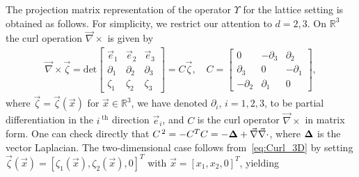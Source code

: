 \documentclass{cmslatex}
\newcommand\bDelta{\mbox{\boldmath${\Delta}$}}
\begin{document}
The projection matrix representation of the operator $\Upsilon$ for the
lattice setting is obtained as follows. For simplicity, we restrict
our attention to $d=2,3$. On $\mathbb{R}^3$ the curl 
operation $\vec{\nabla}\times$ is given by 
%
\begin{align}\label{eq:Curl_3D}
  \vec{\nabla}\times\vec{\zeta}=
     \text{det}\left[
  \begin{array}{ccc}
    \vec{e}_1 &\vec{e}_2 &\vec{e}_3\\
       \partial_1    &   \partial_2    &   \partial_3   \\
       \zeta_1    &   \zeta_2    &   \zeta_3   
    \end{array}
    \right]
    =C\vec{\zeta}, \quad
    C=
    \left[
    \begin{array}{ccc}
       0  & -\partial_3  &   \partial_2 \\
       \partial_3 &  0   &  -\partial_1 \\
      -\partial_2 &  \partial_1  &   0
    \end{array}
    \right],    
\end{align}
%
where $\vec{\zeta}=\vec{\zeta}(\vec{x})$ for $\vec{x}\in\mathbb{R}^3$, we
have denoted $\partial_i$, $i=1,2,3$, to be partial differentiation in the
$i^{\;\text{th}}$ direction $\vec{e}_i$, and $C$ is the curl
operator $\vec{\nabla}\times$ in matrix form. One can check directly
that $C^{\,2}=-C^TC=-\bDelta+\vec{\nabla}\vec{\nabla}\cdot$, where $\bDelta$ is the vector
Laplacian.
The two-dimensional case 
follows from~\eqref{eq:Curl_3D} by setting
$\vec{\zeta}(\vec{x})=[\zeta_1(\vec{x}),\zeta_2(\vec{x}),0]^T$ with
$\vec{x}=[x_1,x_2,0]^T$, yielding   
%
\end{document}
